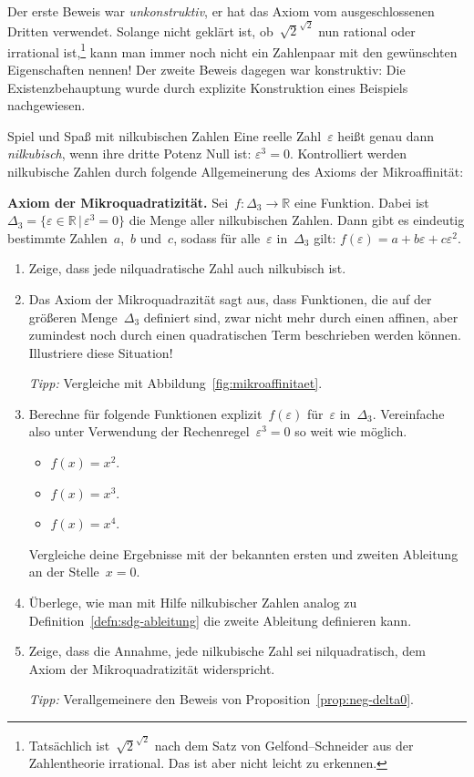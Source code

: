 \documentclass[twoside]{../zirkelblatt}
\newcommand{\RR}{\mathbb{R}}
\theoremstyle{definition}
\theoremstyle{plain}
\theoremstyle{remark}
\begin{document}
Der erste Beweis war \emph{unkonstruktiv}, er hat das Axiom vom
ausgeschlossenen Dritten verwendet. Solange nicht geklärt ist,
ob~$\sqrt{2}^{\sqrt{2}}$ nun rational oder irrational ist,\footnote{Tatsächlich
ist~$\sqrt{2}^{\sqrt{2}}$ nach dem Satz von Gelfond--Schneider aus der
Zahlentheorie irrational. Das ist aber nicht leicht zu erkennen.} kann man
immer noch nicht ein Zahlenpaar mit den gewünschten Eigenschaften nennen! Der
zweite Beweis dagegen war konstruktiv: Die Existenzbehauptung wurde durch
explizite Konstruktion eines Beispiels nachgewiesen.


\begin{aufgabeShaded}{Spiel und Spaß mit nilkubischen Zahlen}
\label{aufg:nilkubisch}
Eine reelle Zahl~$\varepsilon$ heißt genau dann \emph{nilkubisch}, wenn ihre dritte Potenz
Null ist: $\varepsilon^3 = 0$. Kontrolliert werden nilkubische Zahlen durch
folgende Allgemeinerung des Axioms der Mikroaffinität:

\textbf{Axiom der Mikroquadratizität.} Sei~$f : \Delta_3 \to \RR$ eine
Funktion. Dabei ist~$\Delta_3 = \{ \varepsilon \in \RR \,|\, \varepsilon^3 = 0
\}$ die Menge aller nilkubischen Zahlen. Dann gibt es eindeutig bestimmte
Zahlen~$a$,~$b$ und~$c$, sodass für alle~$\varepsilon$ in~$\Delta_3$ gilt:
$f(\varepsilon) = a + b\varepsilon + c\varepsilon^2$.

\begin{enumerate}
\item Zeige, dass jede nilquadratische Zahl auch nilkubisch ist.
\item Das Axiom der Mikroquadrazität sagt aus, dass Funktionen, die auf
der größeren Menge~$\Delta_3$ definiert sind, zwar nicht mehr durch einen
affinen, aber zumindest noch durch einen quadratischen Term beschrieben werden
können. Illustriere diese Situation!

\emph{Tipp:} Vergleiche mit Abbildung~\ref{fig:mikroaffinitaet}.
\item Berechne für folgende Funktionen explizit~$f(\varepsilon)$
für~$\varepsilon$ in~$\Delta_3$. Vereinfache
also unter Verwendung der Rechenregel~$\varepsilon^3 = 0$ so weit wie möglich.
\begin{itemize}
\item $f(x) = x^2$.
\item $f(x) = x^3$.
\item $f(x) = x^4$.
\end{itemize}
Vergleiche deine Ergebnisse mit der bekannten ersten und zweiten Ableitung an
der Stelle~$x = 0$.
\item Überlege, wie man mit Hilfe nilkubischer Zahlen analog zu
Definition~\ref{defn:sdg-ableitung} die zweite Ableitung definieren kann.
\item Zeige, dass die Annahme, jede nilkubische Zahl sei nilquadratisch, dem
Axiom der Mikroquadratizität widerspricht.

\emph{Tipp:} Verallgemeinere den Beweis von Proposition~\ref{prop:neg-delta0}.
\end{enumerate}
\end{aufgabeShaded}
\end{document}
